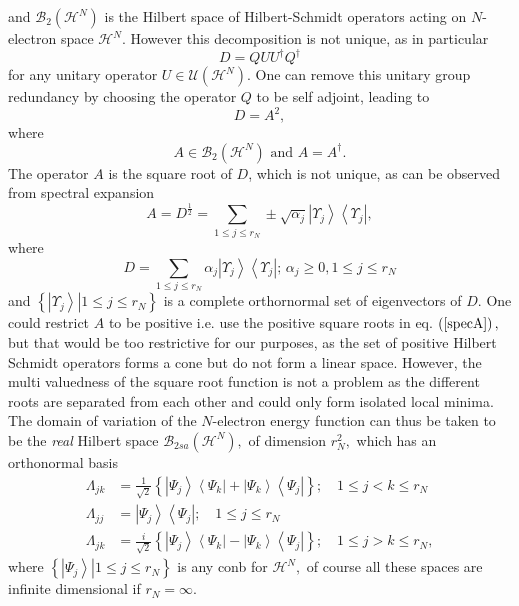 \documentclass[aps,preprint]{revtex4}%
\begin{document}
and $\mathcal{B}_{2}\left(  \mathcal{H}^{N}\right)  $ is the Hilbert space of
Hilbert-Schmidt operators acting on $N$-electron space $\mathcal{H}^{N}$.
However this decomposition is not unique, as in particular
\begin{equation}
D=QUU^{\dagger}Q^{\dagger}%
\end{equation}
for any unitary operator $U\in\mathcal{U}\left(  \mathcal{H}^{N}\right)  $.
One can remove this unitary group redundancy by choosing the operator $Q$ to
be self adjoint, leading to
\begin{equation}
D=A^{2},
\end{equation}
where
\begin{equation}
A\in\mathcal{B}_{2}\left(  \mathcal{H}^{N}\right)  \text{ and }A=A^{\dagger}.
\end{equation}
The operator $A$ is the square root of $D$, which is not unique, as can be
observed from spectral expansion
\begin{equation}
A=D^{\frac{1}{2}}=\sum_{1\leq j\leq r_{N}}\pm\sqrt{\alpha_{j}}\left\vert
\Upsilon_{j}\right\rangle \left\langle \Upsilon_{j}\right\vert , \label{specA}%
\end{equation}
where
\begin{equation}
D=\sum_{1\leq j\leq r_{N}}\alpha_{j}\left\vert \Upsilon_{j}\right\rangle
\left\langle \Upsilon_{j}\right\vert ;\,\alpha_{j}\geq0,1\leq j\leq r_{N}%
\end{equation}
and $\left\{  \left.  \left\vert \Upsilon_{j}\right\rangle \right\vert 1\leq
j\leq r_{N}\right\}  $ is a complete orthornormal set of eigenvectors of $D$.
One could restrict $A$ to be positive i.e. use the positive square roots in
eq. $\left(  \ref{specA}\right)  ,$ but that would be too restrictive for our
purposes, as the set of positive Hilbert Schmidt operators forms a cone but do
not form a linear space. However, the multi valuedness of the square root
function is not a problem as the different roots are separated from each other
and could only form isolated local minima. The domain of variation of the
$N$-electron energy function can thus be taken to be the \emph{real} Hilbert
space $\mathcal{B}_{2sa}\left(  \mathcal{H}^{N}\right)  ,$ of dimension
$r_{N}^{2},$ which has an orthonormal basis
\begin{align}
\Lambda_{jk}  &  =\frac{1}{\sqrt{2}}\left\{  \left\vert \Psi_{j}\right\rangle
\left\langle \Psi_{k}\right\vert +\left\vert \Psi_{k}\right\rangle
\left\langle \Psi_{j}\right\vert \right\}  ;\quad1\leq j<k\leq r_{N}%
\nonumber\\
\Lambda_{jj}  &  =\left\vert \Psi_{j}\right\rangle \left\langle \Psi
_{j}\right\vert ;\quad1\leq j\leq r_{N}\nonumber\\
\Lambda_{jk}  &  =\frac{i}{\sqrt{2}}\left\{  \left\vert \Psi_{j}\right\rangle
\left\langle \Psi_{k}\right\vert -\left\vert \Psi_{k}\right\rangle
\left\langle \Psi_{j}\right\vert \right\}  ;\quad1\leq j>k\leq r_{N},
\end{align}
where $\left\{  \left.  \left\vert \Psi_{j}\right\rangle \right\vert 1\leq
j\leq r_{N}\right\}  $ is any conb for $\mathcal{H}^{N},$ of course all these
spaces are infinite dimensional if $r_{N}=\infty.$
\end{document}
